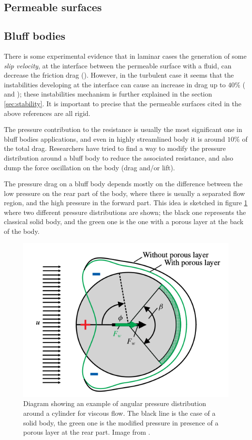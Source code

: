 \subsection{Permeable surfaces}

\subsection{Bluff bodies}

There is some experimental evidence that in laminar cases the generation of some \textit{slip velocity}, at the interface between the permeable surface with a fluid, can decrease the friction drag (\citet{beavers1967boundary}).
However, in the turbulent case it seems that the instabilities developing at the interface can cause an increase in drag up to $40\%$ (\citet{jimenez2001turbulent} and  \citet{breugem2006influence}); these instabilities mechanism is further explained in the section \ref{sec:stability}.
It is important to precise that the permeable surfaces cited in the above references are all rigid.

The pressure contribution to the resistance is usually the most significant one in bluff bodies applications, and even in highly streamlined body it is around $10\%$ of the total drag.
Researchers have tried to find a way to modify the pressure distribution around a bluff body to reduce the associated resistance, and also dump the force oscillation on the body (drag and/or lift).

The pressure drag on a bluff body depends mostly on the difference between the low pressure on the rear part of the body, where there is usually a separated flow region, and the high pressure in the forward part.
This idea is sketched in figure \ref{fig:pressure_dist} where two different pressure distributions are shown; the black one represents the classical solid body, and the green one is the one with a porous layer at the back of the body.

\begin{figure}[h]
	\centering
	\includegraphics[width=0.4\linewidth]{chapter_1/pressure_dist}
	\caption{Diagram showing an example of angular pressure distribution around a cylinder for viscous flow. The black line is the case of a solid body, the green one is the modified pressure in presence of a porous layer at the rear part. Image from \citet{klausmann2017drag}.}
	\label{fig:pressure_dist}
\end{figure}

